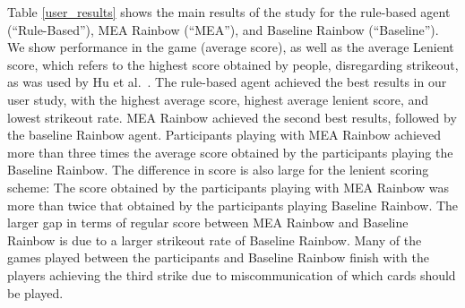 \documentclass[letterpaper]{article} %
\begin{document}
Table \ref{user_results} shows the main results of the study for the rule-based agent (``Rule-Based''), MEA Rainbow (``MEA''), and Baseline Rainbow (``Baseline''). %
We show performance in the game (average score), as well as the average Lenient score, which refers to the highest score obtained by people, disregarding strikeout, as was used by Hu et al.~\cite{OP}.  
The rule-based agent achieved the best results in our user study, with the highest average score, highest average lenient score, and  lowest strikeout rate. MEA Rainbow achieved the second best results, followed by the baseline Rainbow agent. 
Participants playing with MEA Rainbow achieved more than three times the average score obtained by the participants playing the Baseline Rainbow. The difference in score is also large for the lenient scoring scheme: The score obtained by the participants playing with MEA Rainbow was more than twice that obtained by the participants playing Baseline Rainbow. The larger gap in terms of regular score between MEA Rainbow and Baseline Rainbow is due to a larger strikeout rate of Baseline Rainbow. Many of the games played between the participants and Baseline Rainbow finish with the players achieving the third strike due to miscommunication of which cards should be played. 
\end{document}
